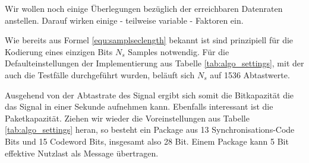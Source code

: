 Wir wollen noch einige Überlegungen bezüglich der erreichbaren Datenraten anstellen. Darauf wirken einige - teilweise variable - Faktoren ein.  

Wie bereits aus Formel \ref{equ:samplseclength} bekannt ist sind prinzipiell für die Kodierung eines einzigen Bits $N_s$ Samples notwendig. Für die Defaulteinstellungen der Implementierung aus Tabelle \ref{tab:algo_settings}, mit der auch die Testfälle durchgeführt wurden, beläuft sich $N_s$ auf 1536 Abtastwerte. 

Ausgehend von der Abtastrate des Signal ergibt sich somit die Bitkapazität die das Signal in einer Sekunde aufnehmen kann. Ebenfalls interessant ist die Paketkapazität. Ziehen wir wieder die Voreinstellungen aus Tabelle \ref{tab:algo_settings} heran, so besteht ein Package aus 13 Synchronisations-Code Bits und 15 Codeword Bits, insgesamt also 28 Bit. Einem Package kann 5 Bit effektive Nutzlast als Message übertragen. 

